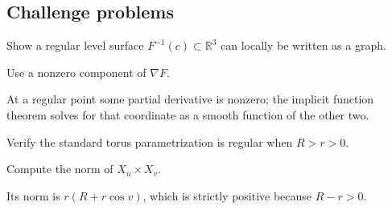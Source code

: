\subsection*{Challenge problems}

\begin{exercise}\label{exr:vii14-ped-15}
Show a regular level surface \(F^{-1}(c)\subset\mathbb R^3\) can locally be written as a graph.
\end{exercise}
\begin{hint}
Use a nonzero component of \(\nabla F\).
\end{hint}
\begin{solution}
At a regular point some partial derivative is nonzero; the implicit function theorem solves for that coordinate as a smooth function of the other two.
\end{solution}

\begin{exercise}\label{exr:vii14-ped-16}
Verify the standard torus parametrization is regular when \(R>r>0\).
\end{exercise}
\begin{hint}
Compute the norm of \(X_u\times X_v\).
\end{hint}
\begin{solution}
Its norm is \(r(R+r\cos v)\), which is strictly positive because \(R-r>0\).
\end{solution}

